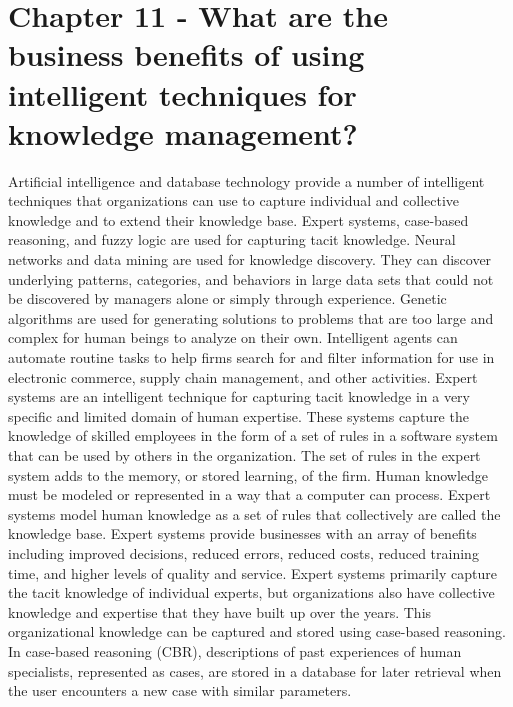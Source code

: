 \documentclass[12pt]{article}
\begin{document}
\section{Chapter 11 - What are the business benefits of using intelligent techniques for knowledge management?}
Artificial intelligence and database technology provide a number of intelligent techniques that organizations can use to capture individual and collective knowledge and to extend their knowledge base. Expert systems, case-based reasoning, and fuzzy logic are used for capturing tacit knowledge. Neural networks and data mining are used for knowledge discovery. They can discover underlying patterns, categories, and behaviors in large data sets that could not be discovered by managers alone or simply through experience. Genetic algorithms are used for generating solutions to problems that are too large and complex for human beings to analyze on their own. Intelligent agents can automate routine tasks to help firms search for and filter information for use in electronic commerce, supply chain management, and other activities. Expert systems are an intelligent technique for capturing tacit knowledge in a very specific and limited domain of human expertise. These systems capture the knowledge of skilled employees in the form of a set of rules in a software system that can be used by others in the organization. The set of rules in the expert system adds to the memory, or stored learning, of the firm. Human knowledge must be modeled or represented in a way that a computer can process. Expert systems model human knowledge as a set of rules that collectively are called the knowledge base. Expert systems provide businesses with an array of benefits including improved decisions, reduced errors, reduced costs, reduced training time, and higher levels of quality and service. Expert systems primarily capture the tacit knowledge of individual experts, but organizations also have collective knowledge and expertise that they have built up over the years. This organizational knowledge can be captured and stored using case-based reasoning. In case-based reasoning (CBR), descriptions of past experiences of human specialists, represented as cases, are stored in a database for later retrieval when the user encounters a new case with similar parameters. 
\end{document}
